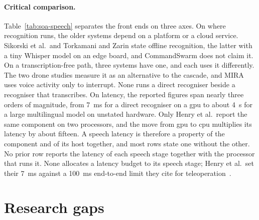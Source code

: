 \paragraph{Critical comparison.} Table~\ref{tab:soa-speech} separates the front ends on three axes.
On where recognition runs, the older systems depend on a platform or a cloud service. Sikorski et
al.\ and Torkamani and Zarin state offline recognition, the latter with a tiny Whisper model on an
edge board, and CommandSwarm does not claim it. On a transcription-free path, three systems have
one, and each uses it differently. The two drone studies measure it as an alternative to the
cascade, and MIRA uses voice activity only to interrupt. None runs a direct recogniser beside a
recogniser that transcribes. On latency, the reported figures span nearly three orders of magnitude,
from 7~ms for a direct recogniser on a \gls{gpu} to about 4~s for a large multilingual model on
unstated hardware. Only Henry et al.\ report the same component on two processors, and the move from
\gls{gpu} to \gls{cpu} multiplies its latency by about fifteen. A speech latency is therefore a
property of the component and of its host together, and most rows state one without the other. No
prior row reports the latency of each speech stage together with the processor that runs it. None
allocates a latency budget to its speech stage; Henry et al.\ set their 7~ms against a 100~ms
end-to-end limit they cite for teleoperation~\cite{henry2026}.

\clearpage
\section{Research gaps}
\label{sec:research-gaps}

